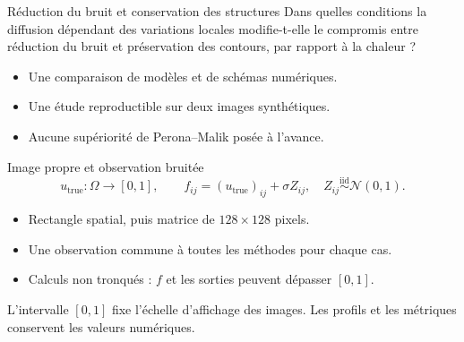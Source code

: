 \documentclass[aspectratio=169,11pt]{beamer}
\newcommand{\sectionlabel}{Projet de Master}
\newcommand{\utrue}{u_{\mathrm{true}}}
\newcommand{\smallgap}{\vspace{0.18cm}}
\begin{document}
\begin{frame}[label=titre,plain]
\end{frame}

\renewcommand{\sectionlabel}{01 / Question et modèles}
\begin{frame}[label=question]{Réduction du bruit et conservation des structures}
  \large
  Dans quelles conditions la diffusion dépendant des variations locales
  modifie-t-elle le compromis entre réduction du bruit et préservation
  des contours, par rapport à la chaleur ?
  \smallgap
  \normalsize
  \begin{itemize}
    \item Une comparaison de modèles et de schémas numériques.
    \item Une étude reproductible sur deux images synthétiques.
    \item Aucune supériorité de Perona--Malik posée à l'avance.
  \end{itemize}
\end{frame}

\begin{frame}[label=observation]{Image propre et observation bruitée}
  \[
    \utrue:\Omega\longrightarrow[0,1],\qquad
    f_{ij}=(\utrue)_{ij}+\sigma Z_{ij},\quad
    Z_{ij}\overset{\mathrm{iid}}{\sim}\mathcal N(0,1).
  \]
  \begin{itemize}
    \item Rectangle spatial, puis matrice de $128\times128$ pixels.
    \item Une observation commune à toutes les méthodes pour chaque cas.
    \item Calculs non tronqués : $f$ et les sorties peuvent dépasser $[0,1]$.
  \end{itemize}
  \smallgap
  L'intervalle $[0,1]$ fixe l'échelle d'affichage des images.
  Les profils et les métriques conservent les valeurs numériques.
\end{frame}
\end{document}

